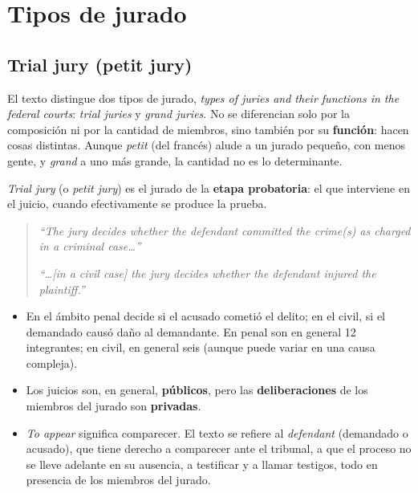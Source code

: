 \documentclass[12pt,oneside]{book}
\begin{document}
\chapter{Tipos de jurado}

\section{Trial jury (petit jury)}

El texto distingue dos tipos de jurado, \textit{types of juries and their functions in the federal courts}: \textit{trial juries} y \textit{grand juries}. No se diferencian solo por la composición ni por la cantidad de miembros, sino también por su \textbf{función}: hacen cosas distintas. Aunque \textit{petit} (del francés) alude a un jurado pequeño, con menos gente, y \textit{grand} a uno más grande, la cantidad no es lo determinante.

\textit{Trial jury} (o \textit{petit jury}) es el jurado de la \textbf{etapa probatoria}: el que interviene en el juicio, cuando efectivamente se produce la prueba.

\begin{quote}
\textit{``The jury decides whether the defendant committed the crime(s) as charged in a criminal case\ldots''}

\textit{``\ldots[in a civil case] the jury decides whether the defendant injured the plaintiff.''}
\end{quote}

\begin{itemize}
\item En el ámbito penal decide si el acusado cometió el delito; en el civil, si el demandado causó daño al demandante. En penal son en general 12 integrantes; en civil, en general seis (aunque puede variar en una causa compleja).
\item Los juicios son, en general, \textbf{públicos}, pero las \textbf{deliberaciones} de los miembros del jurado son \textbf{privadas}.
\item \textit{To appear} significa comparecer. El texto se refiere al \textit{defendant} (demandado o acusado), que tiene derecho a comparecer ante el tribunal, a que el proceso no se lleve adelante en su ausencia, a testificar y a llamar testigos, todo en presencia de los miembros del jurado.
\end{itemize}
\end{document}
